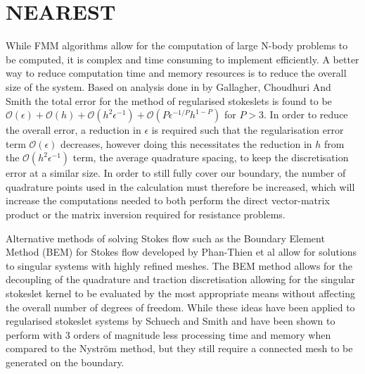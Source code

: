 \FloatBarrier
\section{NEAREST} \label{sec:NEAREST}
While FMM algorithms allow for the computation of large N-body problems to be computed, it is complex and time consuming to implement efficiently. A better way to reduce computation time and memory resources is to reduce the overall size of the system. Based on analysis done in by Gallagher, Choudhuri And Smith \cite{Gallagher2019SharpEquation} the total error for the method of regularised stokeslets is found to be $\mathcal{O}(\epsilon) + \mathcal{O}(h) + \mathcal{O}(h^2\epsilon^{-1}) + \mathcal{O}(P\epsilon^{-1/P} h^{1-P})$ for $P>3$. In order to reduce the overall error, a reduction in $\epsilon$ is required such that the regularisation error term $\mathcal{O}(\epsilon)$ decreases, however doing this necessitates the reduction in $h$ from the $\mathcal{O}(h^2\epsilon^{-1})$ term, the average quadrature spacing, to keep the discretisation error at a similar size. In order to still fully cover our boundary, the number of quadrature points used in the calculation must therefore be increased, which will increase the computations needed to both perform the direct vector-matrix product or the matrix inversion required for resistance problems. 

Alternative methods of solving Stokes flow such as the Boundary Element Method (BEM) for Stokes flow developed by Phan-Thien et al \cite{Tran-Cong1987APropulsion} allow for solutions to singular systems with highly refined meshes. The BEM method allows for the decoupling of the quadrature and traction discretisation allowing for the singular stokeslet kernel to be evaluated by the most appropriate means without affecting the overall number of degrees of freedom. While these ideas have been applied to regularised stokeslet systems by Schuech and Smith\cite{Smith2009AFlow,SchuechMotilePareto-optimal} and have been shown to perform with 3 orders of magnitude less processing time and memory when compared to the Nyström method, but they still require a connected mesh to be generated on the boundary. 


